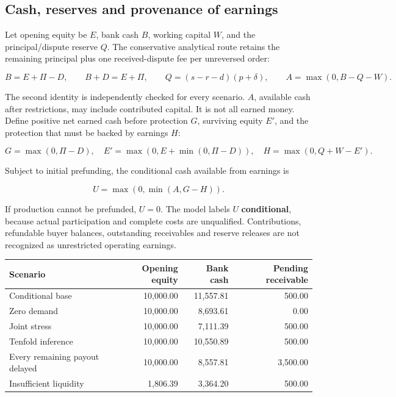 \documentclass[
  11pt,
]{article}
\begin{document}
\hypertarget{cash-reserves-and-provenance-of-earnings}{%
\subsection{Cash, reserves and provenance of
earnings}\label{cash-reserves-and-provenance-of-earnings}}

Let opening equity be \(E\), bank cash \(B\), working capital \(W\), and
the principal/dispute reserve \(Q\). The conservative analytical route
retains the remaining principal plus one received-dispute fee per
unreversed order:

\[
B=E+\Pi-D,\qquad B+D=E+\Pi,\qquad
Q=(s-r-d)(p+\delta),\qquad
A=\max(0,B-Q-W).
\]

The second identity is independently checked for every scenario. \(A\),
available cash after restrictions, may include contributed capital. It
is not all earned money. Define positive net earned cash before
protection \(G\), surviving equity \(E'\), and the protection that must
be backed by earnings \(H\):

\[
G=\max(0,\Pi-D),\quad
E'=\max(0,E+\min(0,\Pi-D)),\quad
H=\max(0,Q+W-E').
\]

Subject to initial prefunding, the conditional cash available from
earnings is

\[
U=\max(0,\min(A,G-H)).
\]

If production cannot be prefunded, \(U=0\). The model labels \(U\)
\textbf{conditional}, because actual participation and complete costs
are unqualified. Contributions, refundable buyer balances, outstanding
receivables and reserve releases are not recognized as unrestricted
operating earnings.

\begin{longtable}[]{@{}lrrr@{}}
\toprule\noalign{}
Scenario & Opening equity & Bank cash & Pending receivable \\
\midrule\noalign{}
\endhead
\bottomrule\noalign{}
\endlastfoot
Conditional base & 10,000.00 & 11,557.81 & 500.00 \\
Zero demand & 10,000.00 & 8,693.61 & 0.00 \\
Joint stress & 10,000.00 & 7,111.39 & 500.00 \\
Tenfold inference & 10,000.00 & 10,550.89 & 500.00 \\
Every remaining payout delayed & 10,000.00 & 8,557.81 & 3,500.00 \\
Insufficient liquidity & 1,806.39 & 3,364.20 & 500.00 \\
\end{longtable}
\end{document}
